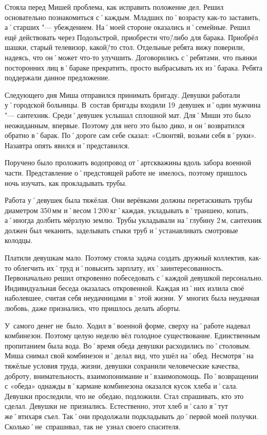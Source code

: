 Стояла перед Мишей проблема, как исправить положение дел. Решил основательно познакомиться с˚каждым. Младших по˚возрасту как-то заставить, а˚старших "--- убеждением. На˚моей стороне оказались и˚семейные. Решил ещё действовать через Подольстрой, приобрести что\=/либо для барака. Приобрёл шашки, старый телевизор, какой\=/то стол. Отдельные ребята вижу поверили, надеясь, что он˚может что-то улучшить. Договорились с˚ребятами, что пьянки посторонних лиц в˚бараке прекратить, просто выбрасывать их из˚барака. Ребята поддержали данное предложение. 

Следующего дня Миша отправился принимать бригаду. Девушки работали у˚городской больницы. В~состав бригады входили 19~девушек и˚один мужчина "--- сантехник. Среди˚девушек услышал сплошной мат. Для˚Миши это было неожиданным, впервые. Поэтому для него это было дико, и он˚возвратился обратно в˚барак. По˚дороге сам себе сказал: «Слюнтяй, возьми себя в˚руки». Назавтра опять явился и˚представился. 

Поручено было проложить водопровод от˚артскважины вдоль забора военной части. Представление о˚предстоящей работе не~имелось, поэтому пришлось ночь изучать, как прокладывать трубы.

Работа у˚девушек была тяжёлая. Они верёвками должны перетаскивать трубы диаметром 350\,мм и˚весом 1\,200\,кг˚каждая, укладывать в˚траншею, копать, а˚иногда долбить мёрзлую землю. Трубы укладывали на˚глубину 2\,м, сантехник должен был чеканить, заделывать стыки труб и˚устанавливать смотровые колодцы.

Платили девушкам мало. Поэтому стояла задача создать дружный коллектив, как-то облегчить их˚труд и˚повысить зарплату, их˚заинтересованность. Первоначально решил откровенно побеседовать с˚каждой девушкой персонально. Индивидуальная беседа оказалась откровенной. Каждая из˚них излила своё наболевшее, считая себя неудачницами в˚этой жизни. У~многих была неудачная любовь, даже признались, что пришлось делать аборты.

У~самого денег не~было. Ходил в˚военной форме, сверху на˚работе надевал комбинезон. Поэтому целую неделю вёл голодное существование. Единственным пропитанием была вода. Во˚время обеда девушки расходились по˚столовым. Миша снимал свой комбинезон и˚делал вид, что ушёл на˚обед. Несмотря˚на тяжёлые условия труда, жизни, девушки сохранили человеческие качества, доброту, внимательность, взаимопонимание и˚взаимопомощь. По˚возвращении с «обеда» однажды в˚кармане комбинезона оказался кусок хлеба и˚сала. Девушки проследили, что не~обедаю, подложили. Стал спрашивать, кто это сделал. Девушки не~признались. Естественно, этот хлеб и˚сало я˚тут же˚втихаря съел. Так˚они продолжали подкладывать до˚первой моей получки. Сколько˚не~спрашивал, так не~узнал своего спасителя.

